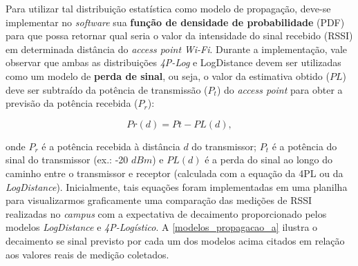 \documentclass[
	12pt,				%
	twoside,			%
	a4paper,			%
	english,			%
	french,				%
	spanish,			%
	brazil				%
	]{abntex2}
\begin{document}
Para utilizar tal distribuição estatística como modelo de propagação,
deve-se implementar no \emph{software} sua \textbf{função de densidade
de probabilidade} (PDF) para que possa retornar qual seria o valor da
intensidade do sinal recebido (RSSI) em determinada distância do
\emph{access point} \emph{Wi-Fi}. Durante a implementação, vale observar
que ambas as distribuições \emph{4P-Log} e LogDistance devem ser
utilizadas como um modelo de \textbf{perda de sinal}, ou seja, o valor
da estimativa obtido (\(PL\)) deve ser subtraído da potência de
transmissão (\(P_{t}\)) do \emph{access point} para obter a previsão da
potência recebida (\(P_{r}\)):

\begin{equation}
    Pr(d) = Pt - PL(d),
\end{equation}

\noindent onde \(P_{r}\) é a potência recebida à distância \(d\) do
transmissor; \(P_{t}\) é a potência do sinal do transmissor (ex.: -20
\(dBm\)) e \(PL(d)\) é a perda do sinal ao longo do caminho entre o
transmissor e receptor (calculada com a equação da 4PL ou da
\emph{LogDistance}). Inicialmente, tais equações foram implementadas em
uma planilha para visualizarmos graficamente uma comparação das medições
de RSSI realizadas no \emph{campus} com a expectativa de decaimento
proporcionado pelos modelos \emph{LogDistance} e \emph{4P-Logístico}. A
\autoref{modelos_propagacao_a} ilustra o decaimento se sinal previsto
por cada um dos modelos acima citados em relação aos valores reais de
medição coletados.
\end{document}
